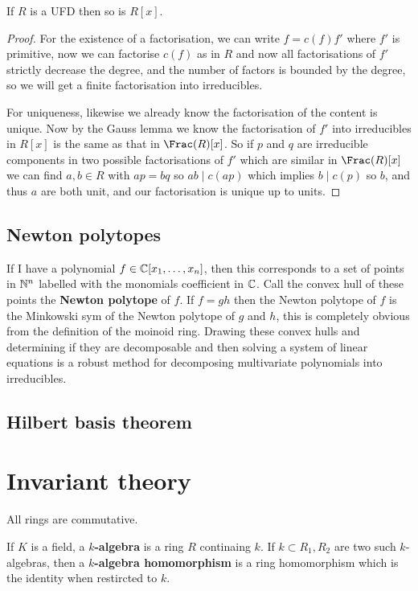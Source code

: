 \documentclass{article}
\begin{document}
\begin{theorem}
    If $R$ is a UFD then so is $R[x]$.
    \begin{proof}
        For the existence of a factorisation, we can write $f=c(f)f'$ where $f'$ is primitive, now we can factorise $c(f)$ as in $R$ and now all factorisations of $f'$ strictly decrease the degree, and the number of factors is bounded by the degree, so we will get a finite factorisation into irreducibles.

        For uniqueness, likewise we already know the factorisation of the content is unique. Now by the Gauss lemma we know the factorisation of $f'$ into irreducibles in $R[x]$ is the same as that in $\Frac(R)[x]$. So if $p$ and $q$ are irreducible components in two possible factorisations of $f'$ which are similar in $\Frac(R)[x]$ we can find $a,b\in R$ with $ap = bq$ so $ab\mid c(ap)$ which implies $b\mid c(p)$ so $b$, and thus $a$ are both unit, and our factorisation is unique up to units.
    \end{proof}
\end{theorem}

\subsection{Newton polytopes}

If I have a polynomial $f\in \mathbb{C}[x_1,\ldots,x_n]$, then this corresponds to a set of points in $\mathbb{N}^n$ labelled with the monomials coefficient in $\mathbb{C}$. Call the convex hull of these points the \textbf{Newton polytope} of $f$. If $f=gh$ then the Newton polytope of $f$ is the Minkowski sym of the Newton polytope of $g$ and $h$, this is completely obvious from the definition of the moinoid ring. Drawing these convex hulls and determining if they are decomposable and then solving a system of linear equations is a robust method for decomposing multivariate polynomials into irreducibles.

\subsection{Hilbert basis theorem}

\section{Invariant theory}

All rings are commutative.

\begin{definition}
    If $K$ is a field, a \textbf{$k$-algebra} is a ring $R$ continaing $k$. If $k\subset R_1,R_2$ are two such $k$-algebras, then a \textbf{$k$-algebra homomorphism} is a ring homomorphism which is the identity when restircted to $k$.
\end{definition}
\end{document}
